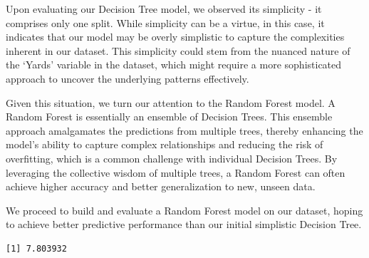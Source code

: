 \documentclass[
  super,
  preprint,
  3p]{elsarticle}
\newenvironment{Shaded}{\begin{snugshade}}{\end{snugshade}}
\newcommand{\AttributeTok}[1]{\textcolor[rgb]{0.40,0.45,0.13}{#1}}
\newcommand{\CommentTok}[1]{\textcolor[rgb]{0.37,0.37,0.37}{#1}}
\newcommand{\DecValTok}[1]{\textcolor[rgb]{0.68,0.00,0.00}{#1}}
\newcommand{\FloatTok}[1]{\textcolor[rgb]{0.68,0.00,0.00}{#1}}
\newcommand{\FunctionTok}[1]{\textcolor[rgb]{0.28,0.35,0.67}{#1}}
\newcommand{\NormalTok}[1]{\textcolor[rgb]{0.00,0.23,0.31}{#1}}
\newcommand{\OtherTok}[1]{\textcolor[rgb]{0.00,0.23,0.31}{#1}}
\newcommand{\SpecialCharTok}[1]{\textcolor[rgb]{0.37,0.37,0.37}{#1}}
\begin{document}
Upon evaluating our Decision Tree model, we observed its simplicity - it
comprises only one split. While simplicity can be a virtue, in this
case, it indicates that our model may be overly simplistic to capture
the complexities inherent in our dataset. This simplicity could stem
from the nuanced nature of the `Yards' variable in the dataset, which
might require a more sophisticated approach to uncover the underlying
patterns effectively.

Given this situation, we turn our attention to the Random Forest model.
A Random Forest is essentially an ensemble of Decision Trees. This
ensemble approach amalgamates the predictions from multiple trees,
thereby enhancing the model's ability to capture complex relationships
and reducing the risk of overfitting, which is a common challenge with
individual Decision Trees. By leveraging the collective wisdom of
multiple trees, a Random Forest can often achieve higher accuracy and
better generalization to new, unseen data.

We proceed to build and evaluate a Random Forest model on our dataset,
hoping to achieve better predictive performance than our initial
simplistic Decision Tree.

\begin{Shaded}
\end{Shaded}

\begin{verbatim}
[1] 7.803932
\end{verbatim}
\end{document}
